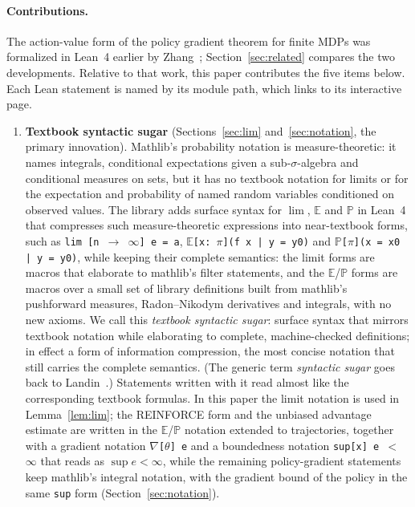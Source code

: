 \documentclass[11pt,a4paper]{article}
\newcommand{\E}{\mathbb{E}}
\newcommand{\Prb}{\mathbb{P}}
\begin{document}
\paragraph{Contributions.}
The action-value form of the policy gradient theorem for finite MDPs was formalized in Lean~4 earlier by Zhang~\cite{zhang2026pg}; Section~\ref{sec:related} compares the two developments.
Relative to that work, this paper contributes the five items below.
Each Lean statement is named by its module path, which links to its interactive page.
\begin{enumerate}[leftmargin=1.6em,itemsep=0.35em]
  \item \textbf{Textbook syntactic sugar} (Sections~\ref{sec:lim} and~\ref{sec:notation}, the primary innovation). Mathlib's probability notation is measure-theoretic: it names integrals, conditional expectations given a sub-$\sigma$-algebra and conditional measures on sets, but it has no textbook notation for limits or for the expectation and probability of named random variables conditioned on observed values. The library adds surface syntax for $\lim$, $\E$ and $\Prb$ in Lean~4 that compresses such measure-theoretic expressions into near-textbook forms, such as \texttt{lim [n $\to$ $\infty$] e = a}, \texttt{$\mathbb{E}$[x: $\pi$](f x | y = y0)} and \texttt{$\mathbb{P}$[$\pi$](x = x0 | y = y0)}, while keeping their complete semantics: the limit forms are macros that elaborate to mathlib's filter statements, and the $\E$/$\Prb$ forms are macros over a small set of library definitions built from mathlib's pushforward measures, Radon--Nikodym derivatives and integrals, with no new axioms. We call this \emph{textbook syntactic sugar}: surface syntax that mirrors textbook notation while elaborating to complete, machine-checked definitions; in effect a form of information compression, the most concise notation that still carries the complete semantics. (The generic term \emph{syntactic sugar} goes back to Landin~\cite{landin1964mechanical}.) Statements written with it read almost like the corresponding textbook formulas. In this paper the limit notation is used in Lemma~\ref{lem:lim}; the REINFORCE form and the unbiased advantage estimate are written in the $\E$/$\Prb$ notation extended to trajectories, together with a gradient notation \texttt{$\nabla$[$\theta$] e} and a boundedness notation \texttt{sup[x] e $<$ $\infty$} that reads as $\sup e<\infty$, while the remaining policy-gradient statements keep mathlib's integral notation, with the gradient bound of the policy in the same \texttt{sup} form (Section~\ref{sec:notation}).

\end{enumerate}
\end{document}
